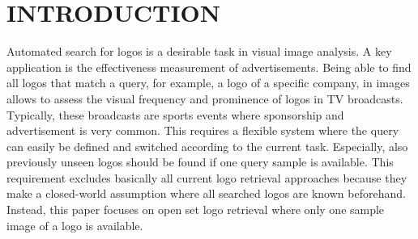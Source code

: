 \documentclass[a4paper,twoside]{article}
\begin{document}
\section{\uppercase{Introduction}}
\label{sec:introduction}
%
%
%
\noindent Automated search for logos is a desirable task in visual image analysis.
A key application is the effectiveness measurement of advertisements. Being able to find all logos that match a query, for example, a logo of a specific company, in images allows to assess the visual frequency and prominence of logos in TV broadcasts. Typically, these broadcasts are sports events where sponsorship and advertisement is very common. 
This requires a flexible system where the query can easily be defined and switched according to the current task. Especially, also previously unseen logos should be found if one query sample is available.
This requirement excludes basically all current logo retrieval approaches because they make a closed-world assumption where all searched logos are known beforehand. Instead, this paper focuses on open set logo retrieval where only one sample image of a logo is available. 
\end{document}
